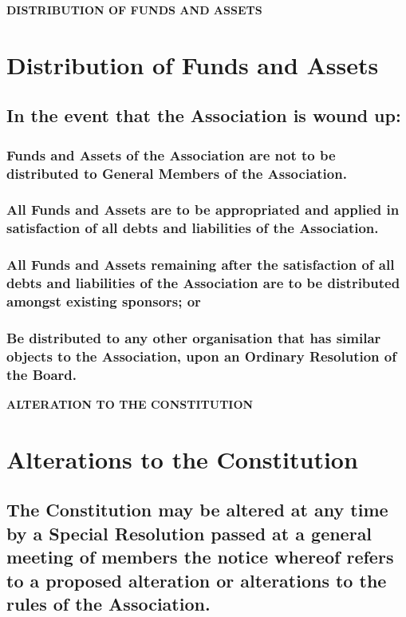 \documentclass{article}
\newenvironment{subs}
  {\adjustwidth{2em}{0pt}}
  {\endadjustwidth}
\begin{document}
\begin{subs}
\begin{subs}
\vspace{5mm}
{\large\bf DISTRIBUTION OF FUNDS AND ASSETS\par}
\hrulefill
\vspace{5mm}

\section{Distribution of Funds and Assets}
\begin{subs}
\subsection{In the event that the Association is wound up:}
\begin{subs}
\subsubsection{Funds and Assets of the Association are not to be distributed to General Members of the Association.}
\subsubsection{All Funds and Assets are to be appropriated and applied in satisfaction of all debts and liabilities of the Association.}
\subsubsection{All Funds and Assets remaining after the satisfaction of all debts and liabilities of the Association are to be distributed amongst existing sponsors; or}
\subsubsection{Be distributed to any other organisation that has similar objects to the Association, upon an Ordinary Resolution of the Board.}
\end{subs}
\end{subs}
\newpage

\vspace{5mm}
{\large\bf ALTERATION TO THE CONSTITUTION\par}
\hrulefill

\section{Alterations to the Constitution}
\begin{subs}
\subsection{The Constitution may be altered at any time by a Special Resolution passed at a general meeting of members the notice whereof refers to a proposed alteration or alterations to the rules of the Association.}

\end{subs}
\end{subs}
\end{subs}
\end{document}
